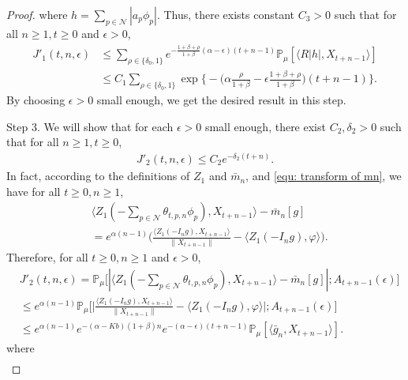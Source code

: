 \documentclass[12pt,a4paper]{amsart}
\theoremstyle{plain}
\theoremstyle{definition}
\numberwithin{equation}{section}
\begin{document}
\begin{proof}
    where $h=\sum_{p\in \mathcal{N}}|a_p\phi_p|$.
    Thus, there exists constant $C_3>0$ such that for all $n\geq 1,  t\geq 0$ and $\epsilon > 0$,
\begin{align}
\label{eq: estimate of J11}
     J'_1(t,n,\epsilon)&
     \leq  \sum_{\rho\in\{\delta_0,1\}}e^{-\frac{1+\beta+\rho}{1+\beta}(\alpha-\epsilon)(t+n-1)}\mathbb{P}_{\mu}[\langle R|h|,X_{t+n-1}\rangle]\\
     & \leq C_1\sum_{\rho\in\{\delta_0,1\}}\exp\Big\{-\Big(\alpha\frac{\rho}{1+\beta}-\epsilon\frac{1+\beta+\rho}{1+\beta}\Big)(t+n-1)\Big\}.
\end{align}
    By choosing $\epsilon>0$ small enough, we get the desired result in this step.

    Step 3.
    We will show that for each $\epsilon > 0$ small enough, there exist $C_2,\delta_2>0$ such that for all $n\geq 1, t\geq 0$,
\begin{align}
\label{eq:31step31}
    J'_2(t,n,\epsilon)
    \leq C_2 e^{-\delta_2(t+n)}.
\end{align}
    In fact, according to the definitions of $Z_1$ and $\bar{m}_n$, and \eqref{equ: transform of mn}, we have for all $t\geq 0, n\geq1$,
\begin{align}
    &\langle Z_1(-\sum_{p\in \mathcal{N}}\theta_{t,p,n}\phi_p), X_{t+n-1}\rangle-\bar{m}_n[g]\\
    &=e^{\alpha(n-1)}\Big(\frac{\langle Z_1(-I_ng),X_{t+n-1}\rangle}{\|X_{t+n-1}\|}-\langle Z_1(-I_ng),\varphi\rangle\Big).
\end{align}
    Therefore, for all $t\geq 0, n\geq1$ and $\epsilon > 0$,
\begin{align}
    &J'_2(t,n,\epsilon)
	= \mathbb{P}_{\mu}\big[|\langle Z_1(-\sum_{p\in\mathcal{N}}\theta_{t,p,n}\phi_p),X_{t+n-1}\rangle-\bar{m}_n[g]|; A_{t+n-1}(\epsilon)\big]\\
	&\leq e^{\alpha(n-1)}\mathbb{P}_{\mu}\Big[\big|\frac{\langle Z_1(-I_ng),X_{t+n-1}\rangle}{\|X_{t+n-1}\|}-\langle Z_1(-I_ng),\varphi\rangle\big|;A_{t+n-1}(\epsilon)\Big]\\
	&\leq e^{\alpha(n-1)}e^{-(\alpha-Kb)(1+\beta)n}e^{-(\alpha-\epsilon)(t+n-1)}\mathbb{P}_{\mu}
    [\langle \bar {g}_n, X_{t+n-1}\rangle].
\end{align}
    where
\begin{align}

\end{align}
\end{proof}
\end{document}
